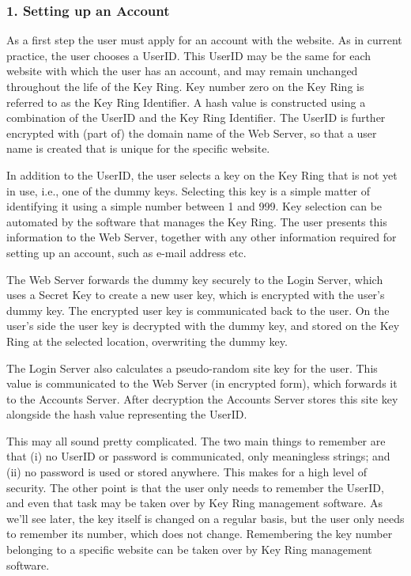 \subsubsection{1. Setting up an Account}
As a first step the user must apply for an account with the website.
As in current practice, the user chooses a UserID.
This UserID may be the same for each website with which the user has an account, and may remain unchanged throughout the life of the Key Ring.
Key number zero on the Key Ring is referred to as the Key Ring Identifier.
A hash value is constructed using a combination of the UserID and the Key Ring Identifier.
The UserID is further encrypted with (part of) the domain name of the Web Server, so that a user name is created that is unique for the specific website.
\par
In addition to the UserID, the user selects a key on the Key Ring that is not yet in use, i.e., one of the dummy keys.
Selecting this key is a simple matter of identifying it using a simple number between 1 and 999.
Key selection can be automated by the software that manages the Key Ring.
The user presents this information to the Web Server, together with any other information required for setting up an account, such as e-mail address etc.
\par
The Web Server forwards the dummy key securely to the Login Server, which uses a Secret Key to create a new user key, which is encrypted with the user's dummy key.
The encrypted user key is communicated back to the user.
On the user's side the user key is decrypted with the dummy key, and stored on the Key Ring at the selected location, overwriting the dummy key.
\par
The Login Server also calculates a pseudo-random site key for the user.
This value is communicated to the Web Server (in encrypted form), which forwards it to the Accounts Server.
After decryption the Accounts Server stores this site key alongside the hash value representing the UserID.
\par
This may all sound pretty complicated.
The two main things to remember are that (i) no UserID or password is communicated, only meaningless strings; and (ii) no password is used or stored anywhere.
This makes for a high level of security.
The other point is that the user only needs to remember the UserID, and even that task may be taken over by Key Ring management software.
As we'll see later, the key itself is changed on a regular basis, but the user only needs to remember its number, which does not change.
Remembering the key number belonging to a specific website can be taken over by Key Ring management software.
%
